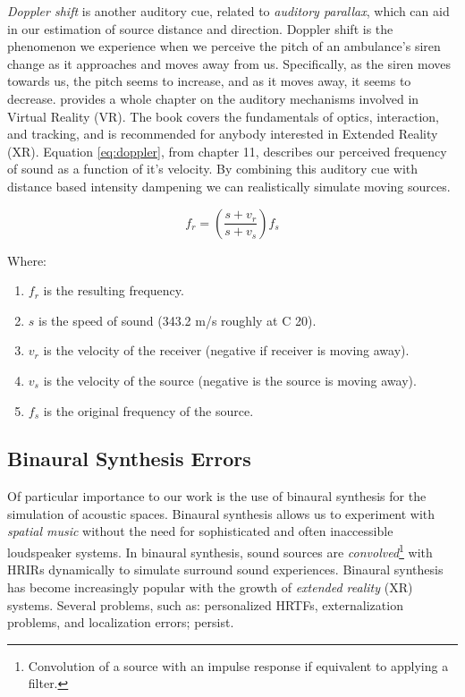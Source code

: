 \textit{Doppler shift} is another auditory cue, related to \textit{auditory parallax}, which can aid in our estimation of source distance and direction. Doppler shift is the phenomenon we experience when we perceive the pitch of an ambulance's siren change as it approaches and moves away from us. Specifically, as the siren moves towards us, the pitch seems to increase, and as it moves away, it seems to decrease. \cite{lavalle2016virtual} provides a whole chapter on the auditory mechanisms involved in Virtual Reality (VR). The book covers the fundamentals of optics, interaction, and tracking, and is recommended for anybody interested in Extended Reality (XR). Equation \ref{eq:doppler}, from chapter 11, describes our perceived frequency of sound as a function of it's velocity. By combining this auditory cue with distance based intensity dampening we can realistically simulate moving sources.

\begin{equation}
f_{r}=\left(\frac{s+v_{r}}{s+v_{s}}\right) f_{s}
\label{eq:doppler}
\end{equation}

Where: 
\begin{enumerate}
    \item $f_r$ is the resulting frequency.
    \item $s$ is the speed of sound (343.2 m/s roughly at C 20\textdegree).
    \item $v_r$ is the velocity of the receiver (negative if receiver is moving away). 
    \item $v_s$ is the velocity of the source (negative is the source is moving away).
    \item $f_s$ is the original frequency of the source.
\end{enumerate}

\subsection{Binaural Synthesis Errors}

Of particular importance to our work is the use of binaural synthesis for the simulation of acoustic spaces. Binaural synthesis allows us to experiment with \textit{spatial music} without the need for sophisticated and often inaccessible loudspeaker systems. In binaural synthesis, sound sources are \textit{convolved}\footnote{Convolution of a source with an impulse response if equivalent to applying a filter.} with HRIRs dynamically to simulate surround sound experiences. Binaural synthesis has become increasingly popular with the growth of \textit{extended reality} (XR) systems. Several problems, such as: personalized HRTFs, externalization problems, and localization errors; persist. 

